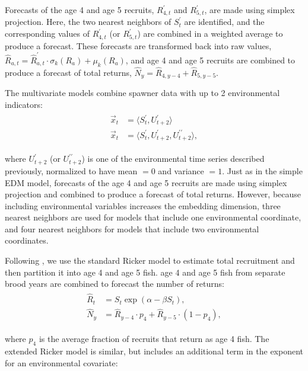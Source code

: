 Forecasts of the age 4 and age 5 recruits, $R^\prime_{4, t}$ and $R^\prime_{5, t}$, are made using simplex projection. Here, the two nearest neighbors of $S^\prime_t$ are identified, and the corresponding values of $R^\prime_{4, t}$ (or $R^\prime_{5, t}$) are combined in a weighted average to produce a forecast. These forecasts are transformed back into raw values, $\hat{R}_{a, t} = \hat{R}^\prime_{a, t} \cdot \sigma_k(R_a) + \mu_k(R_a)$, and age 4 and age 5 recruits are combined to produce a forecast of total returns, $\hat{N}_y = \hat{R}_{4, y-4} + \hat{R}_{5, y-5}$.

The multivariate models combine spawner data with up to 2 environmental indicators:
\begin{align}
\begin{split}
\vec{x}_t &= \langle S^\prime_t, U^\prime_{t+2} \rangle\\
\vec{x}_t &= \langle S^\prime_t, U^\prime_{t+2}, U^{\prime\prime}_{t+2} \rangle,
\end{split}
\end{align}

where $U^\prime_{t+2}$ (or $U^{\prime\prime}_{t+2}$) is one of the environmental time series described previously, normalized to have mean $= 0$ and variance $= 1$. Just as in the simple EDM model, forecasts of the age 4 and age 5 recruits are made using simplex projection and combined to produce a forecast of total returns. However, because including environmental variables increases the embedding dimension, three nearest neighbors are used for models that include one environmental coordinate, and four nearest neighbors for models that include two environmental coordinates.

Following \cite{Grant_2010}, we use the standard Ricker model to estimate total recruitment and then partition it into age 4 and age 5 fish. age 4 and age 5 fish from separate brood years are combined to forecast the number of returns:
\begin{align}
\begin{split}
\hat{R}_t &= S_t \exp{(\alpha - \beta S_t)},\\
\hat{N}_y &= \hat{R}_{y-4} \cdot p_4 + \hat{R}_{y-5} \cdot (1 - p_4),
\end{split}
\end{align}

where $p_4$ is the average fraction of recruits that return as age 4 fish. The extended Ricker model is similar, but includes an additional term in the exponent for an environmental covariate:

